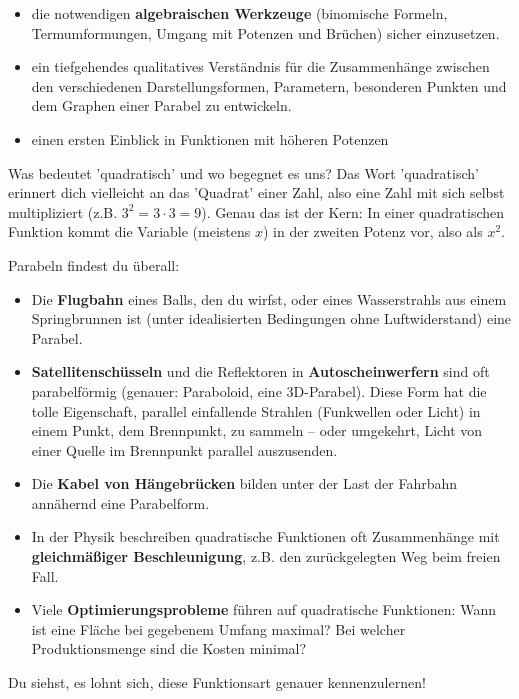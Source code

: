 \begin{tcolorbox}[colback=blue!5!white, colframe=blue!75!black, title=Was du in diesem Kapitel lernen wirst:]
\begin{itemize}[noitemsep, topsep=0pt, leftmargin=*, itemsep=2pt]
    \item die notwendigen \textbf{algebraischen Werkzeuge} (binomische Formeln, Termumformungen, Umgang mit Potenzen und Brüchen) sicher einzusetzen.
    \item ein tiefgehendes qualitatives Verständnis für die Zusammenhänge zwischen den verschiedenen Darstellungsformen, Parametern, besonderen Punkten und dem Graphen einer Parabel zu entwickeln.
    \item einen ersten Einblick in Funktionen mit höheren Potenzen
\end{itemize}
\end{tcolorbox}
\bigskip

\begin{infoboxumgebung}{Was bedeutet 'quadratisch' und wo begegnet es uns?}
Das Wort 'quadratisch' erinnert dich vielleicht an das 'Quadrat' einer Zahl, also eine Zahl mit sich selbst multipliziert (z.B. $3^2 = 3 \cdot 3 = 9$). Genau das ist der Kern: In einer quadratischen Funktion kommt die Variable (meistens $x$) in der zweiten Potenz vor, also als $x^2$.

Parabeln findest du überall:
\begin{itemize}
    \item Die \textbf{Flugbahn} eines Balls, den du wirfst, oder eines Wasserstrahls aus einem Springbrunnen ist (unter idealisierten Bedingungen ohne Luftwiderstand) eine Parabel.
    \item \textbf{Satellitenschüsseln} und die Reflektoren in \textbf{Autoscheinwerfern} sind oft parabelförmig (genauer: Paraboloid, eine 3D-Parabel). Diese Form hat die tolle Eigenschaft, parallel einfallende Strahlen (Funkwellen oder Licht) in einem Punkt, dem Brennpunkt, zu sammeln – oder umgekehrt, Licht von einer Quelle im Brennpunkt parallel auszusenden.
    \item Die \textbf{Kabel von Hängebrücken} bilden unter der Last der Fahrbahn annähernd eine Parabelform.
    \item In der Physik beschreiben quadratische Funktionen oft Zusammenhänge mit \textbf{gleichmäßiger Beschleunigung}, z.B. den zurückgelegten Weg beim freien Fall.
    \item Viele \textbf{Optimierungsprobleme} führen auf quadratische Funktionen: Wann ist eine Fläche bei gegebenem Umfang maximal? Bei welcher Produktionsmenge sind die Kosten minimal?
\end{itemize}
Du siehst, es lohnt sich, diese Funktionsart genauer kennenzulernen!
\end{infoboxumgebung}

